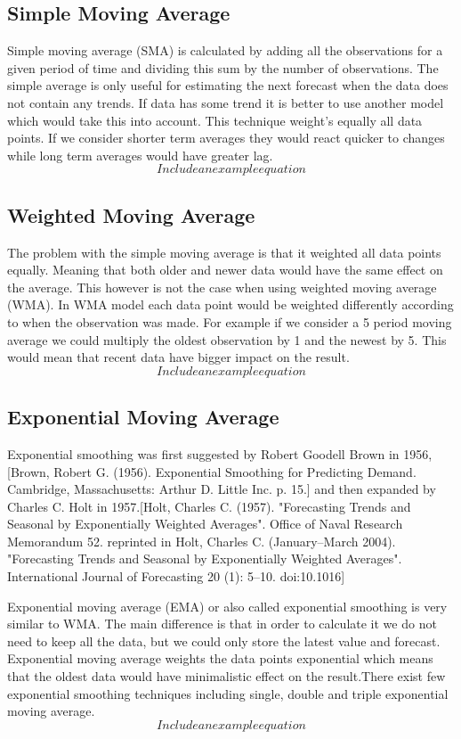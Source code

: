 \subsection{Simple Moving Average}
Simple moving average (SMA) is calculated by adding all the observations for a given period of time and dividing this sum by the number of observations. The simple average is only useful for estimating the next forecast when the data does not contain any trends. If data has some trend it is better to use another model which would take this into account. This technique weight's equally all data points. If we consider shorter term averages they would react quicker to changes while long term averages would have greater lag.\\
\[Include an example equation\]
\subsection{Weighted Moving Average}
The problem with the simple moving average is that it weighted all data points equally. Meaning that both older and newer data would have the same effect on the average. This however is not the case when using weighted moving average (WMA). In WMA model each data point would be weighted differently according to when the observation was made. For example if we consider a 5 period moving average we could multiply the oldest observation by 1 and the newest by 5. This would mean that recent data have bigger impact on the result.
\[Include an example equation\]
\subsection{Exponential Moving Average}
Exponential smoothing was first suggested by Robert Goodell Brown in 1956,[Brown, Robert G. (1956). Exponential Smoothing for Predicting Demand. Cambridge, Massachusetts: Arthur D. Little Inc. p. 15.] and then expanded by Charles C. Holt in 1957.[Holt, Charles C. (1957). "Forecasting Trends and Seasonal by Exponentially Weighted Averages". Office of Naval Research Memorandum 52. reprinted in Holt, Charles C. (January–March 2004). "Forecasting Trends and Seasonal by Exponentially Weighted Averages". International Journal of Forecasting 20 (1): 5–10. doi:10.1016]

Exponential moving average (EMA) or also called exponential smoothing is very similar to WMA. The main difference is that in order to calculate it we do not need to keep all the data, but we could only store the latest value and forecast. Exponential moving average weights the data points exponential which means that the oldest data would have minimalistic effect on the result.There exist few exponential smoothing techniques including single, double and triple exponential moving average.
\[Include an example equation\]
